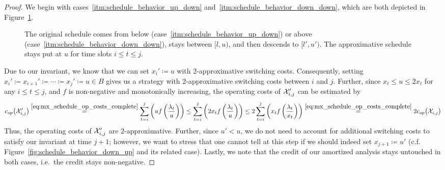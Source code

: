 \begin{proof}
We begin with cases~\ref{itm:schedule_behavior_up_down} and~\ref{itm:schedule_behavior_down_down}, which are both depicted in Figure~\ref{fig:schedule_behavior_down}.
\begin{figure}[ht]
\captionsetup[subfigure]{labelformat=empty}
\begin{subfigure}[b]{0.49\textwidth}

\end{subfigure}
\hfill
\begin{subfigure}[b]{0.49\textwidth}

\end{subfigure}
\caption{The original schedule comes from below (case~\ref{itm:schedule_behavior_up_down}) or above (case~\ref{itm:schedule_behavior_down_down}), stays between $[l,u)$, and then descends to $[l',u')$. The approximative schedule stays put at $u$ for time slots $i\le t\le j$.}
\label{fig:schedule_behavior_down}
\end{figure}
Due to our invariant, we know that we can set $x_i'\coloneqq u$ with 2-approximative switching costs. Consequently, setting $x_i'\coloneqq x_{i+1}'\coloneqq\dotsb\coloneqq x_j'\coloneqq u\in B$ gives us a strategy with 2-approximative switching costs between $i$ and $j$. Further, since $x_t\le u\le2x_t$ for any $i\le t\le j$, and $f$ is non-negative and monotonically increasing, the operating costs of $\mathcal{X}'_{i,j}$ can be estimated by
\begin{equation*}
	c_{op}\bigl(\mathcal{X}_{i,j}'\bigr)\stackrel{\eqref{eq:mx_schedule_op_costs_complete}}{=}\sum\limits_{t=i}^j\left(uf\left(\frac{\lambda_t}{u}\right)\right)\le\sum\limits_{t=i}^j\left(2x_tf\left(\frac{\lambda_t}{u}\right)\right)\le2\sum\limits_{t=i}^j\left(x_tf\left(\frac{\lambda_t}{x_t}\right)\right)\stackrel{\eqref{eq:mx_schedule_op_costs_complete}}{=}2c_{op}\bigl(\mathcal{X}_{i,j}\bigr)
\end{equation*}
Thus, the operating costs of $\mathcal{X}_{i,j}'$ are 2-approximative. Further, since $u'<u$, we do not need to account for additional switching costs to satisfy our invariant at time $j+1$; however, we want to stress that one cannot tell at this step if we should indeed set $x_{j+1}\coloneqq u'$ (c.f. Figure~\ref{fig:schedule_behavior_down_up} and its related case). Lastly, we note that the credit of our amortized analysis stays untouched in both cases, i.e.\ the credit stays non-negative.
	

\end{proof}
